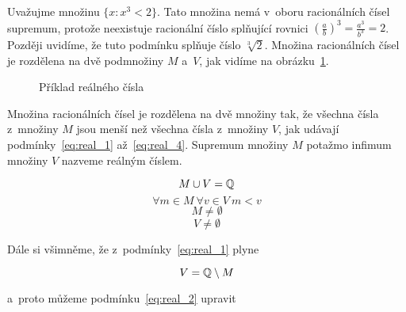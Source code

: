 Uvažujme množinu \(\{x: x^3 < 2\}\). Tato množina nemá v~oboru racionálních čísel supremum, protože neexistuje racionální číslo splňující rovnici \(\left( \frac{a}{b} \right)^3 = \frac{a^3}{b^3} = 2\). Později uvidíme, že tuto podmínku splňuje číslo \(\sqrt[3]{2}\). Množina racionálních čísel je rozdělena na dvě podmnožiny \(M\) a~\(V\), jak vidíme na obrázku~\ref{img:real_numbers_example}.

\begin{figure}[!h]
\centering
{}
\caption{Příklad reálného čísla}
\label{img:real_numbers_example}
\end{figure}

Množina racionálních čísel je rozdělena na dvě množiny tak, že všechna čísla z~množiny \(M\) jsou menší než všechna čísla z~množiny \(V\), jak udávají podmínky~\eqref{eq:real_1} až~\eqref{eq:real_4}. Supremum množiny \(M\) potažmo infimum množiny \(V\) nazveme reálným číslem.

\begin{equation}
\label{eq:real_1}
M \cup V = \mathbb{Q}
\end{equation}
\begin{equation}
\label{eq:real_2}
\forall m \in M \ \forall v \in V \ m < v
\end{equation}
\begin{equation}
\label{eq:real_3}
M \neq \emptyset
\end{equation}
\begin{equation}
\label{eq:real_4}
V \neq \emptyset
\end{equation}

Dále si všimněme, že z~podmínky~\eqref{eq:real_1} plyne

\begin{equation}
V = \mathbb{Q} \setminus M
\end{equation}

a~proto můžeme podmínku~\eqref{eq:real_2} upravit

